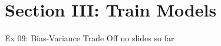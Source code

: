 \documentclass[mathserif, aspectratio=1610]{intbeamer}
\begin{document}

\section{Section III: Train Models}
\begin{frame}[t]{Ex 09: Bias-Variance Trade Off}
no slides so far
\end{frame}
\end{document}
